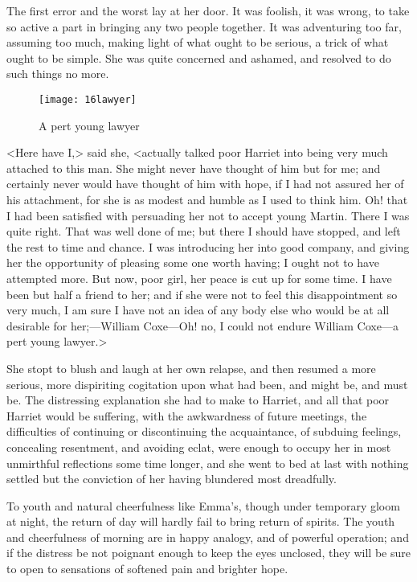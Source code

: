 The first error and the worst lay at her door. It was foolish, it was wrong, to take so active a part in bringing any two people together. It was adventuring too far, assuming too much, making light of what ought to be serious, a trick of what ought to be simple. She was quite concerned and ashamed, and resolved to do such things no more.

\begin{figure}[tbph]
\centering
\texttt{[image: 16lawyer]}
\caption{A pert young lawyer}
\end{figure}

<Here have I,> said she, <actually talked poor Harriet into being very much attached to this man. She might never have thought of him but for me; and certainly never would have thought of him with hope, if I had not assured her of his attachment, for she is as modest and humble as I used to think him. Oh! that I had been satisfied with persuading her not to accept young Martin. There I was quite right. That was well done of me; but there I should have stopped, and left the rest to time and chance. I was introducing her into good company, and giving her the opportunity of pleasing some one worth having; I ought not to have attempted more. But now, poor girl, her peace is cut up for some time. I have been but half a friend to her; and if she were not to feel this disappointment so very much, I am sure I have not an idea of any body else who would be at all desirable for her;—William Coxe—Oh! no, I could not endure William Coxe—a pert young lawyer.>

She stopt to blush and laugh at her own relapse, and then resumed a more serious, more dispiriting cogitation upon what had been, and might be, and must be. The distressing explanation she had to make to Harriet, and all that poor Harriet would be suffering, with the awkwardness of future meetings, the difficulties of continuing or discontinuing the acquaintance, of subduing feelings, concealing resentment, and avoiding eclat, were enough to occupy her in most unmirthful reflections some time longer, and she went to bed at last with nothing settled but the conviction of her having blundered most dreadfully.

To youth and natural cheerfulness like Emma's, though under temporary gloom at night, the return of day will hardly fail to bring return of spirits. The youth and cheerfulness of morning are in happy analogy, and of powerful operation; and if the distress be not poignant enough to keep the eyes unclosed, they will be sure to open to sensations of softened pain and brighter hope.


